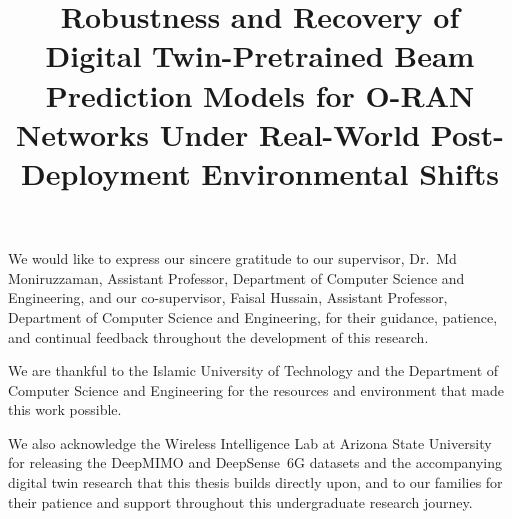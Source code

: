 \documentclass{iutbscthesis}
\title{Robustness and Recovery of Digital Twin-Pretrained Beam Prediction Models for O-RAN Networks Under Real-World Post-Deployment Environmental Shifts}
\begin{document}

\coverpage


\titlepage

\declarationofcandidate


\tableofcontents
\listoffigures
\listoftables

\clearpage

\begin{abbreviations}
\end{abbreviations}

\begin{acknowledgement}

We would like to express our sincere gratitude to our supervisor, Dr.\ Md Moniruzzaman, Assistant Professor, Department of Computer Science and Engineering, and our co-supervisor, Faisal Hussain, Assistant Professor, Department of Computer Science and Engineering, for their guidance, patience, and continual feedback throughout the development of this research.

We are thankful to the Islamic University of Technology and the Department of Computer Science and Engineering for the resources and environment that made this work possible.

We also acknowledge the Wireless Intelligence Lab at Arizona State University for releasing the DeepMIMO and DeepSense~6G datasets and the accompanying digital twin research that this thesis builds directly upon, and to our families for their patience and support throughout this undergraduate research journey.

\end{acknowledgement}
\end{document}
